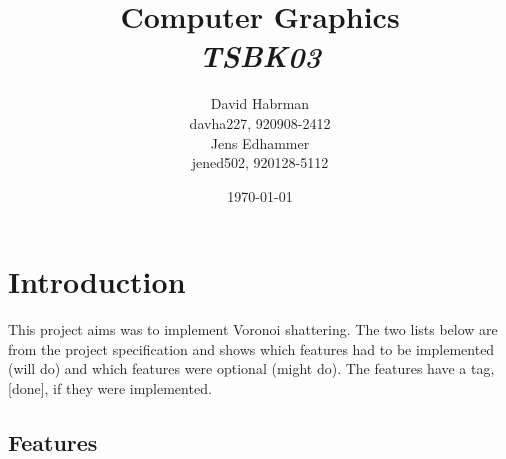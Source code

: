 \documentclass[10pt]{article}
\title{Computer Graphics\\
\emph{TSBK03}}
\author{David Habrman \\ davha227, 920908-2412\\
Jens Edhammer \\ jened502, 920128-5112 }
\date{\today}
\begin{document}
\maketitle

\newpage
\newpage

\section{Introduction}

This project aims was to implement Voronoi shattering. The two lists below
are from the project specification and shows which features had to be
implemented (will do) and which features were optional (might do).
The features have a tag, [done], if they were implemented.

\subsection{Features}
\end{document}
